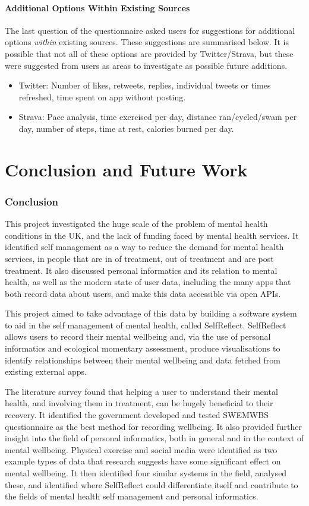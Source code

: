 \documentclass[11pt,openright,a4paper]{report}
\begin{document}
\subsubsection{Additional Options Within Existing Sources}
The last question of the questionnaire asked users for suggestions for additional options \emph{within} existing sources. These suggestions are summarised below. It is possible that not all of these options are provided by Twitter/Strava, but these were suggested from users as areas to investigate as possible future additions.
\begin{itemize}
\item Twitter: Number of likes, retweets, replies, individual tweets or times refreshed, time spent on app without posting.
\item Strava: Pace analysis, time exercised per day, distance ran/cycled/swam per day, number of steps, time at rest, calories burned per day.
\end{itemize}

\chapter{Conclusion and Future Work}
\subsection{Conclusion}
This project investigated the huge scale of the problem of mental health conditions in the UK, and the lack of funding faced by mental health services. It identified self management as a way to reduce the demand for mental health services, in people that are in of treatment, out of treatment and are post treatment. It also discussed personal informatics and its relation to mental health, as well as the modern state of user data, including the many apps that both record data about users, and make this data accessible via open APIs.

This project aimed to take advantage of this data by building a software system to aid in the self management of mental health, called SelfReflect. SelfReflect allows users to record their mental wellbeing and, via the use of personal informatics and ecological momentary assessment, produce visualisations to identify relationships between their mental wellbeing and data fetched from existing external apps.

The literature survey found that helping a user to understand their mental health, and involving them in treatment, can be hugely beneficial to their recovery. It identified the government developed and tested SWEMWBS questionnaire as the best method for recording wellbeing. It also provided further insight into the field of personal informatics, both in general and in the context of mental wellbeing. Physical exercise and social media were identified as two example types of data that research suggests have some significant effect on mental wellbeing. It then identified four similar systems in the field, analysed these, and identified where SelfReflect could differentiate itself and contribute to the fields of mental health self management and personal informatics.
\end{document}
